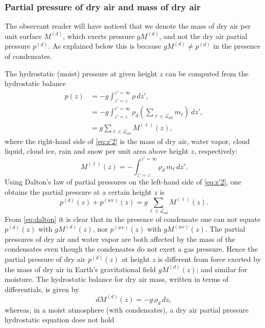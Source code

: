 \documentclass{agujournal}
\begin{document}
{\subsubsection{Partial pressure of dry air and mass of dry air}\label{sec:dryairp}
The observant reader will have noticed that we denote the mass of dry air per unit surface  $M^{(d)}$, which exerts pressure $gM^{(d)}$, and not the dry air partial pressure $p^{(d)}$. As explained below this is because $gM^{(d)}\neq p^{(d)}$ in the presence of condensates. 

The hydrostatic (moist) pressure at given height $z$ can be computed from the hydrostatic balance
\begin{align}
p(z)&=-g\int^{z'=\infty}_{z'=z}\rho\, dz',\\
 &=-g\int^{z'=\infty}_{z'=z}\rho_d \left( \sum_{\ell \in \mathcal{L}_{all}} m_\ell \right)\, dz',\\
 &=g\sum_{\ell \in \mathcal{L}_{all}} M^{(\ell)}(z),\label{eq:z'2}
\end{align}
where the right-hand side of \eqref{eq:z'2} is the mass of dry air, water vapor, cloud liquid, cloud ice, rain and snow per unit area above height $z$, respectively:
\begin{equation}
{M}^{(\ell)}(z)=-\int^{z'=\infty}_{z'=z}\rho_d \, m_\ell \, dz'\label{eq:z'}.
\end{equation}
Using Dalton's law of partial pressures on the left-hand side of \eqref{eq:z'2}, one obtains the partial pressure at a certain height $z$ is
\begin{equation}
p^{(d)}(z)+p^{(wv)}(z)=g\sum_{\ell \in \mathcal{L}_{all}} {M}^{(\ell)}(z).\label{eq:dalton}
\end{equation}
From \eqref{eq:dalton} it is clear that in the presence of condensate one can not equate $p^{(d)}(z)$ with $g{M}^{(d)}(z)$, nor $p^{(wv)}(z)$ with $g{M}^{(wv)}(z)$. The partial pressures of dry air and water vapor are both affected by the mass of the condensates even though the condensates do not exert a gas pressure. Hence the partial pressure of dry air $p^{(d)}(z)$ at height $z$ is different from force exerted by the mass of dry air in Earth's gravitational field $gM^{(d)}(z)$; and similar for moisture. The hydrostatic balance for dry air mass, written in terms of differentials, is given by
\begin{equation}
dM^{(d)}(z)=-g\, \rho_d\, dz,\label{eq:dry_atm_hydro}
\end{equation}
whereas, in a moist atmosphere (with condensates), a dry air partial pressure hydrostatic equation does not hold
}
\end{document}
